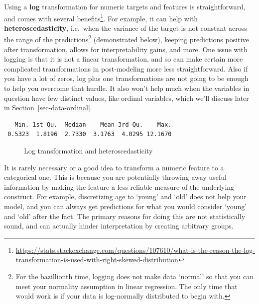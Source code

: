 \documentclass[
  letterpaper,
]{krantz}
\DeclareRobustCommand{\href}[2]{#2\footnote{\url{#1}}}
\begin{document}
Using a \textbf{log} transformation for numeric targets and features is
straightforward, and
\href{https://stats.stackexchange.com/questions/107610/what-is-the-reason-the-log-transformation-is-used-with-right-skewed-distribution}{comes
with several benefits}. For example, it can help with
\textbf{heteroscedasticity}, i.e.~when the variance of the target is not
constant across the range of the predictions\footnote{For the
  bazillionth time, logging does not make data `normal' so that you can
  meet your normality assumption in linear regression. The only time
  that would work is if your data is log-normally distributed to begin
  with.} (demonstrated below), keeping predictions positive after
transformation, allows for interpretability gains, and more. One issue
with logging is that it is not a linear transformation, and so can make
certain more complicated transformations in post-modeling more less
straightforward. Also if you have a lot of zeros, log plus one
transformations are not going to be enough to help you overcome that
hurdle. It also won't help much when the variables in question have few
distinct values, like ordinal variables, which we'll discuss later in
Section~\ref{sec-data-ordinal}.

\begin{verbatim}
   Min. 1st Qu.  Median    Mean 3rd Qu.    Max. 
 0.5323  1.8196  2.7330  3.1763  4.0295 12.1670 
\end{verbatim}

\begin{figure}[H]


\caption{\label{fig-log-transformation-heteroscedasticity}Log
transformation and heteroscedasticity}

\end{figure}%

\begin{tcolorbox}[enhanced jigsaw, bottomrule=.15mm, rightrule=.15mm, colframe=quarto-callout-tip-color-frame, colback=white, breakable, arc=.35mm, left=2mm, opacityback=0, leftrule=.75mm, toprule=.15mm]

It is rarely necessary or a good idea to transform a numeric feature to
a categorical one. This is because you are potentially throwing away
useful information by making the feature a less reliable measure of the
underlying construct. For example, discretizing age to `young' and `old'
does not help your model, and you can always get predictions for what
you would consider `young' and `old' after the fact. The primary reasons
for doing this are not statistically sound, and can actually hinder
interpretation by creating arbitrary groups.

\end{tcolorbox}
\end{document}
